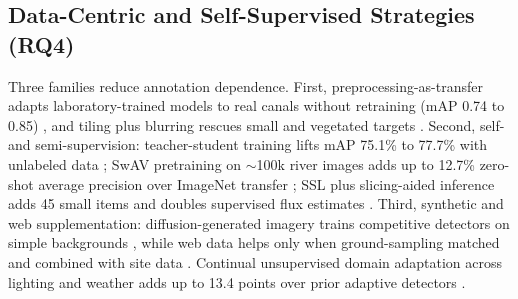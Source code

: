 \subsection{Data-Centric and Self-Supervised Strategies (RQ4)}
Three families reduce annotation dependence. First, preprocessing-as-transfer adapts laboratory-trained models to real canals without retraining (mAP 0.74 to 0.85) \cite{Nunkhaw2025}, and tiling plus blurring rescues small and vegetated targets \cite{FrontEnv2025}. Second, self- and semi-supervision: teacher-student training lifts mAP 75.1\% to 77.7\% with unlabeled data \cite{Sun2025}; SwAV pretraining on $\sim$100k river images adds up to 12.7\% zero-shot average precision over ImageNet transfer \cite{JiaSwAV2024}; SSL plus slicing-aided inference adds 45 small items and doubles supervised flux estimates \cite{JiaFlux2025}. Third, synthetic and web supplementation: diffusion-generated imagery trains competitive detectors on simple backgrounds \cite{Pan2023}, while web data helps only when ground-sampling matched and combined with site data \cite{Pan2022}. Continual unsupervised domain adaptation across lighting and weather adds up to 13.4 points over prior adaptive detectors \cite{EAAI2023}.

